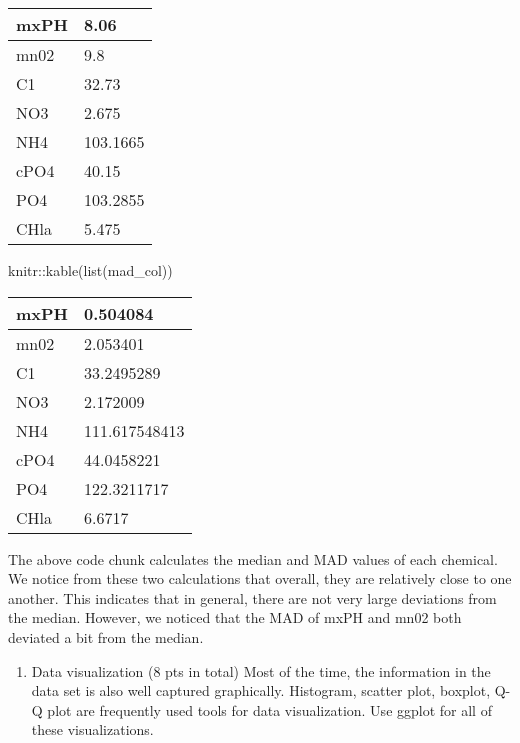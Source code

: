 \documentclass[
]{article}
\newenvironment{Shaded}{\begin{snugshade}}{\end{snugshade}}
\newcommand{\FunctionTok}[1]{\textcolor[rgb]{0.00,0.00,0.00}{#1}}
\newcommand{\NormalTok}[1]{#1}
\newcommand{\SpecialCharTok}[1]{\textcolor[rgb]{0.00,0.00,0.00}{#1}}
\providecommand{\tightlist}{%
  \setlength{\itemsep}{0pt}\setlength{\parskip}{0pt}}
\begin{document}
\begin{table}

\centering
\begin{tabular}[t]{l|l}
\hline
mxPH & 8.06\\
\hline
mn02 & 9.8\\
\hline
C1 & 32.73\\
\hline
NO3 & 2.675\\
\hline
NH4 & 103.1665\\
\hline
cPO4 & 40.15\\
\hline
PO4 & 103.2855\\
\hline
CHla & 5.475\\
\hline
\end{tabular}
\end{table}

\begin{Shaded}
\begin{Highlighting}[]
\NormalTok{knitr}\SpecialCharTok{::}\FunctionTok{kable}\NormalTok{(}\FunctionTok{list}\NormalTok{(mad\_col))}
\end{Highlighting}
\end{Shaded}

\begin{table}

\centering
\begin{tabular}[t]{l|l}
\hline
mxPH & 0.504084\\
\hline
mn02 & 2.053401\\
\hline
C1 & 33.2495289\\
\hline
NO3 & 2.172009\\
\hline
NH4 & 111.617548413\\
\hline
cPO4 & 44.0458221\\
\hline
PO4 & 122.3211717\\
\hline
CHla & 6.6717\\
\hline
\end{tabular}
\end{table}

The above code chunk calculates the median and MAD values of each
chemical. We notice from these two calculations that overall, they are
relatively close to one another. This indicates that in general, there
are not very large deviations from the median. However, we noticed that
the MAD of mxPH and mn02 both deviated a bit from the median.

\begin{enumerate}
\def\labelenumi{\arabic{enumi}.}
\setcounter{enumi}{1}
\tightlist
\item
  Data visualization (8 pts in total) Most of the time, the information
  in the data set is also well captured graphically. Histogram, scatter
  plot, boxplot, Q-Q plot are frequently used tools for data
  visualization. Use ggplot for all of these visualizations.
\end{enumerate}
\end{document}
